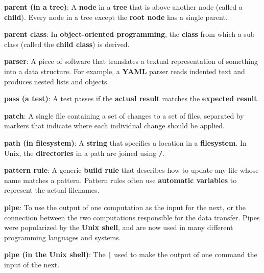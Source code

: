 \documentclass[krantzl]{krantz}
\newcommand{\glosskey}[1]{\textbf{#1}}
\begin{document}
\noindent \textbf{{\newline}\glosskey{parent (in a tree)}}: 
A \glosskey{node} in a \glosskey{tree} that is above another node (called a \glosskey{child}). Every node in a tree except the \glosskey{root node} has a single parent.


\noindent \textbf{{\newline}\glosskey{parent class}}: 
In \glosskey{object-oriented programming}, the \glosskey{class} from which a sub class (called the \glosskey{child class}) is derived.


\noindent \textbf{{\newline}\glosskey{parser}}: 
A piece of software that translates a textual representation of something into a data structure. For example, a \glosskey{YAML} parser reads indented text and produces nested lists and objects.


\noindent \textbf{{\newline}\glosskey{pass (a test)}}: 
A test passes if the \glosskey{actual result} matches the \glosskey{expected result}.


\noindent \textbf{{\newline}\glosskey{patch}}: 
A single file containing a set of changes to a set of files, separated by markers that indicate where each individual change should be applied.


\noindent \textbf{{\newline}\glosskey{path (in filesystem)}}: 
A \glosskey{string} that specifies a location in a \glosskey{filesystem}. In Unix, the \glosskey{directories} in a path are joined using \texttt{/}.


\noindent \textbf{{\newline}\glosskey{pattern rule}}: 
A generic \glosskey{build rule} that describes how to update any file whose name matches a pattern. Pattern rules often use \glosskey{automatic variables} to represent the actual filenames.


\noindent \textbf{{\newline}\glosskey{pipe}}: 
To use the output of one computation as the input for the next, or the connection between the two computations responsible for the data transfer. Pipes were popularized by the \glosskey{Unix shell}, and are now used in many different programming languages and systems.


\noindent \textbf{{\newline}\glosskey{pipe (in the Unix shell)}}: 
The \texttt{|} used to make the output of one command the input of the next.
\end{document}
